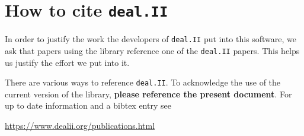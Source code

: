 \documentclass{ansarticle-preprint}
\newcommand{\specialword}[1]{\texttt{#1}}
\newcommand{\dealii}{{\specialword{deal.II}}\xspace}
\begin{document}
\section{How to cite \dealii}\label{sec:cite}

In order to justify the work the developers of \dealii{} put into this
software, we ask that papers using the library reference one of the
\dealii{} papers. This helps us justify the effort we put into it.

There are various ways to reference \dealii{}. To acknowledge the use of
the current version of the library, \textbf{please reference the present
  document}. For up to date information and a bibtex entry
see
\begin{center}
  \url{https://www.dealii.org/publications.html}
\end{center}
\end{document}
